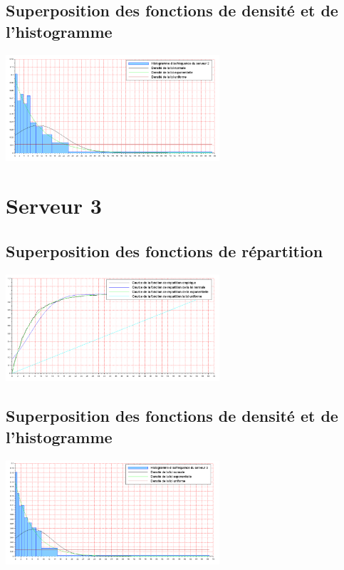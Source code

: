 \documentclass{article}
\begin{document}
\paragraph{}

\subsection{Superposition des fonctions de densité et de l'histogramme}
\begin{center}
\includegraphics[width=300px]{img/S2_densite.png}
\end{center}
\paragraph{}

\section{Serveur 3}

\subsection{Superposition des fonctions de répartition}
\begin{center}
\includegraphics[width=300px]{img/S3_repartitions.png}
\end{center}
\paragraph{}

\subsection{Superposition des fonctions de densité et de l'histogramme}
\begin{center}
\includegraphics[width=300px]{img/S3_densite.png}
\end{center}
\end{document}
